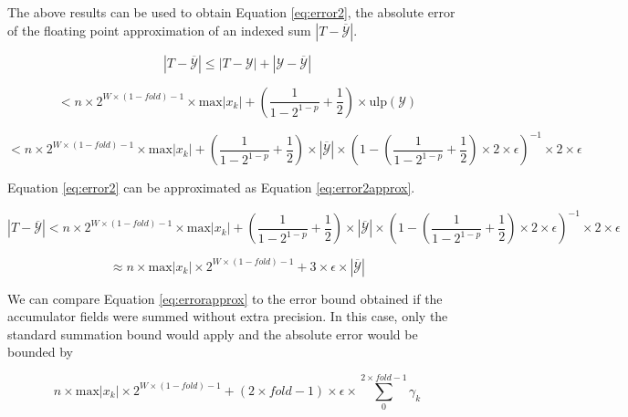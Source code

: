 \documentclass[12pt]{article}
\providecommand{\max}{\ensuremath{\text{max}}}
\providecommand{\ulp}{\ensuremath{\text{ulp}}}
\theoremstyle{plain}
\begin{document}
    The above results can be used to obtain Equation \ref{eq:error2}, the absolute error of the floating point approximation of an indexed sum $|T - \overline{\mathcal{Y}}|$.

    \begin{equation*}
      |T - \overline{\mathcal{Y}}| \leq |T - \mathcal{Y}| + |\mathcal{Y} - \overline{\mathcal{Y}}|
    \end{equation*}

    \begin{equation*}
      < n \times 2^{W \times (1 - fold) - 1} \times \max|x_k| + (\frac{1}{1 - 2^{1 - p}} + \frac{1}{2})\times \ulp(\mathcal{Y})
    \end{equation*}

    \begin{equation}
      < n \times 2^{W \times (1 - fold) - 1} \times \max|x_k| + (\frac{1}{1 - 2^{1 - p}} + \frac{1}{2})\times|\overline{\mathcal{Y}}|\times (1 - (\frac{1}{1 - 2^{1 - p}} + \frac{1}{2})\times 2 \times \epsilon)^{-1} \times 2 \times \epsilon
      \label{eq:error2}
    \end{equation}

    Equation \ref{eq:error2} can be approximated as Equation \ref{eq:error2approx}.

    \begin{equation*}
      |T - \overline{\mathcal{Y}}| < n \times 2^{W \times (1 - fold) - 1} \times \max|x_k| + (\frac{1}{1 - 2^{1 - p}} + \frac{1}{2})\times|\overline{\mathcal{Y}}|\times (1 - (\frac{1}{1 - 2^{1 - p}} + \frac{1}{2})\times 2 \times \epsilon)^{-1} \times 2 \times \epsilon
    \end{equation*}

    \begin{equation}
      \approx n \times \max|x_k|\times 2^{W \times (1 - fold) - 1} + 3 \times \epsilon \times |\overline{\mathcal{Y}}|
      \label{eq:error2approx}
    \end{equation}

    We can compare Equation \ref{eq:errorapprox} to the error bound obtained if the accumulator fields were summed without extra precision. In this case, only the standard summation bound would apply and the absolute error would be bounded by

    \begin{equation*}
    n \times \max|x_k|\times 2^{W \times (1 - fold) - 1} + (2 \times fold - 1) \times \epsilon \times \sum\limits_0^{2 \times fold - 1}\gamma_k
    \end{equation*}
\end{document}
